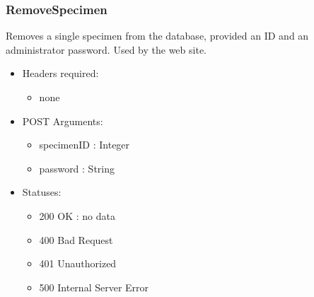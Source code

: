     \subsubsection{RemoveSpecimen}
        Removes a single specimen from the database, provided an ID and an administrator password. Used by the web site.
        \begin{itemize}
            \item Headers required: 
            \begin{itemize}
                \item none
            \end{itemize}
            \item POST Arguments:
            \begin{itemize}
                \item specimenID : Integer
                \item password : String
            \end{itemize}
            \item Statuses:
            \begin{itemize}
                \item 200 OK : no data
                \item 400 Bad Request
                \item 401 Unauthorized
                \item 500 Internal Server Error
            \end{itemize}
        \end{itemize}


